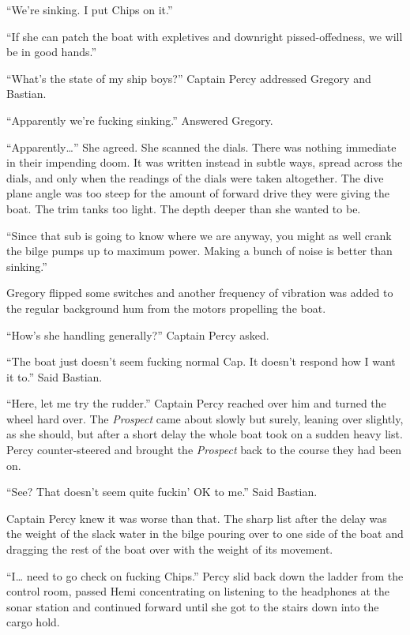 \documentclass[]{scrbook}
\begin{document}
``We're sinking. I put Chips on it.''

``If she can patch the boat with expletives and downright
pissed-offedness, we will be in good hands.''

``What's the state of my ship boys?'' Captain Percy addressed Gregory
and Bastian.

``Apparently we're fucking sinking.'' Answered Gregory.

``Apparently\ldots{}'' She agreed. She scanned the dials. There was
nothing immediate in their impending doom. It was written instead in
subtle ways, spread across the dials, and only when the readings of the
dials were taken altogether. The dive plane angle was too steep for the
amount of forward drive they were giving the boat. The trim tanks too
light. The depth deeper than she wanted to be.

``Since that sub is going to know where we are anyway, you might as well
crank the bilge pumps up to maximum power. Making a bunch of noise is
better than sinking.''

Gregory flipped some switches and another frequency of vibration was
added to the regular background hum from the motors propelling the boat.

``How's she handling generally?'' Captain Percy asked.

``The boat just doesn't seem fucking normal Cap. It doesn't respond how
I want it to.'' Said Bastian.

``Here, let me try the rudder.'' Captain Percy reached over him and
turned the wheel hard over. The \emph{Prospect} came about slowly but
surely, leaning over slightly, as she should, but after a short delay
the whole boat took on a sudden heavy list. Percy counter-steered and
brought the \emph{Prospect} back to the course they had been on.

``See? That doesn't seem quite fuckin' OK to me.'' Said Bastian.

Captain Percy knew it was worse than that. The sharp list after the
delay was the weight of the slack water in the bilge pouring over to one
side of the boat and dragging the rest of the boat over with the weight
of its movement.

``I\ldots{} need to go check on fucking Chips.'' Percy slid back down
the ladder from the control room, passed Hemi concentrating on listening
to the headphones at the sonar station and continued forward until she
got to the stairs down into the cargo hold.
\end{document}
